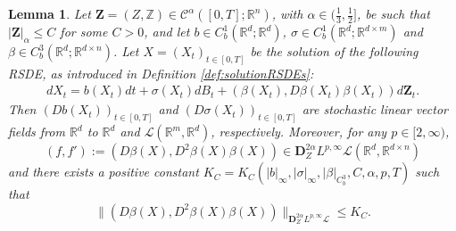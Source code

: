 \documentclass[11pt,a4paper]{article}
\newcommand{\R}{\mathbb{R}}
\theoremstyle{plain}
\newtheorem{lemma}[defn]{Lemma}
\begin{document}
\begin{lemma} \label{lemma:consistencyandaprioriforstochasticlinearvectorfields}
    Let $\mathbf{Z}=(Z,\mathbb{Z})\in\mathscr{C}^\alpha([0,T];\R^n)$, with $\alpha\in (\frac{1}{3},\frac{1}{2}]$, be such that $|\mathbf{Z}|_\alpha \le C$ for some $C>0$, and let $b\in {C}^1_b(\R^d;\R^d)$, $\sigma\in C^1_b(\R^d;\R^{d\times m})$ and $\beta \in {C}^3_b(\R^d;\R^{d\times n})$. Let $X=(X_t)_{t\in [0,T]}$ be the solution of the following RSDE, as introduced in Definition \ref{def:solutionRSDEs}: \begin{align*}
        dX_t = b(X_t)dt + \sigma(X_t)dB_t + (\beta(X_t),D\beta(X_t)\beta(X_t))d\mathbf{Z}_t.
    \end{align*}
    Then $(Db(X_t))_{t \in [0,T]}$ and $(D\sigma(X_t))_{t \in [0,T]}$ are stochastic linear vector fields from $\R^d$ to $\R^d$ and $\mathscr{L}(\R^m,\R^d)$, respectively. Moreover, for any $p \in [2,\infty)$, \begin{equation*}
     (f, f') := (D\beta(X),D^2\beta(X)\beta(X)) \in \mathbf{D}^{2\alpha}_ZL^{p,\infty}\mathscr{L}(\R^d,\R^{d \times n})
    \end{equation*} and there exists a positive constant $K_C=K_C(|b|_\infty,|\sigma|_\infty,|\beta|_{{C}^3_b},C,\alpha,p,T)$ such that  \begin{equation} \label{eq:estimateinaprioriforlinearvectorfields}
        \|(D\beta(X),D^2\beta(X)\beta(X))\|_{ \mathbf{D}^{2\alpha}_ZL^{p,\infty}\mathscr{L}} \le K_C.
    \end{equation}
\end{lemma}
\end{document}

